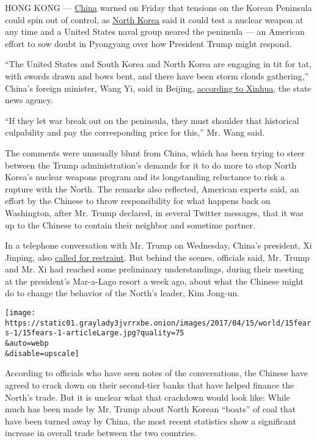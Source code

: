 HONG KONG ---
\href{https://www.nytimes3xbfgragh.onion/topic/destination/china?inline=nyt-geo}{China}
warned on Friday that tensions on the Korean Peninsula could spin out of
control, as
\href{https://www.nytimes3xbfgragh.onion/topic/destination/north-korea?8qa}{North
Korea} said it could test a nuclear weapon at any time and a United
States naval group neared the peninsula --- an American effort to sow
doubt in Pyongyang over how President Trump might respond.

``The United States and South Korea and North Korea are engaging in tit
for tat, with swords drawn and bows bent, and there have been storm
clouds gathering,'' China's foreign minister, Wang Yi, said in Beijing,
\href{http://news.xinhuanet.com/politics/2017-04/14/c_1120812558.htm}{according
to Xinhua}, the state news agency.

``If they let war break out on the peninsula, they must shoulder that
historical culpability and pay the corresponding price for this,'' Mr.
Wang said.

The comments were unusually blunt from China, which has been trying to
steer between the Trump administration's demands for it to do more to
stop North Korea's nuclear weapons program and its longstanding
reluctance to risk a rupture with the North. The remarks also reflected,
American experts said, an effort by the Chinese to throw responsibility
for what happens back on Washington, after Mr. Trump declared, in
several Twitter messages, that it was up to the Chinese to contain their
neighbor and sometime partner.

In a telephone conversation with Mr. Trump on Wednesday, China's
president, Xi Jinping, also
\href{http://www.fmprc.gov.cn/mfa_eng/zxxx_662805/t1453741.shtml}{called
for restraint}. But behind the scenes, officials said, Mr. Trump and Mr.
Xi had reached some preliminary understandings, during their meeting at
the president's Mar-a-Lago resort a week ago, about what the Chinese
might do to change the behavior of the North's leader, Kim Jong-un.

\texttt{[image: https://static01.graylady3jvrrxbe.onion/images/2017/04/15/world/15fears-1/15fears-1-articleLarge.jpg?quality=75\\\&auto=webp\\\&disable=upscale]}

According to officials who have seen notes of the conversations, the
Chinese have agreed to crack down on their second-tier banks that have
helped finance the North's trade. But it is unclear what that crackdown
would look like: While much has been made by Mr. Trump about North
Korean ``boats'' of coal that have been turned away by China, the most
recent statistics show a significant increase in overall trade between
the two countries.

